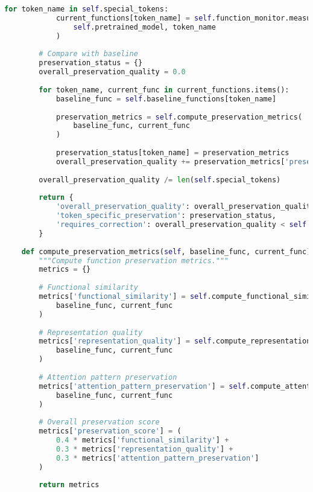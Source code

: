 \begin{lstlisting}[language=Python, caption=Function-preserving fine-tuning framework]
        for token_name in self.special_tokens:
            current_functions[token_name] = self.function_monitor.measure_token_functions(
                self.pretrained_model, token_name
            )
        
        # Compare with baseline
        preservation_status = {}
        overall_preservation_quality = 0.0
        
        for token_name, current_func in current_functions.items():
            baseline_func = self.baseline_functions[token_name]
            
            preservation_metrics = self.compute_preservation_metrics(
                baseline_func, current_func
            )
            
            preservation_status[token_name] = preservation_metrics
            overall_preservation_quality += preservation_metrics['preservation_score']
        
        overall_preservation_quality /= len(self.special_tokens)
        
        return {
            'overall_preservation_quality': overall_preservation_quality,
            'token_specific_preservation': preservation_status,
            'requires_correction': overall_preservation_quality < self.config['min_preservation_threshold']
        }
    
    def compute_preservation_metrics(self, baseline_func, current_func):
        """Compute function preservation metrics."""
        metrics = {}
        
        # Functional similarity
        metrics['functional_similarity'] = self.compute_functional_similarity(
            baseline_func, current_func
        )
        
        # Representation quality
        metrics['representation_quality'] = self.compute_representation_quality(
            baseline_func, current_func
        )
        
        # Attention pattern preservation
        metrics['attention_pattern_preservation'] = self.compute_attention_pattern_preservation(
            baseline_func, current_func
        )
        
        # Overall preservation score
        metrics['preservation_score'] = (
            0.4 * metrics['functional_similarity'] +
            0.3 * metrics['representation_quality'] +
            0.3 * metrics['attention_pattern_preservation']
        )
        
        return metrics


\end{lstlisting}
